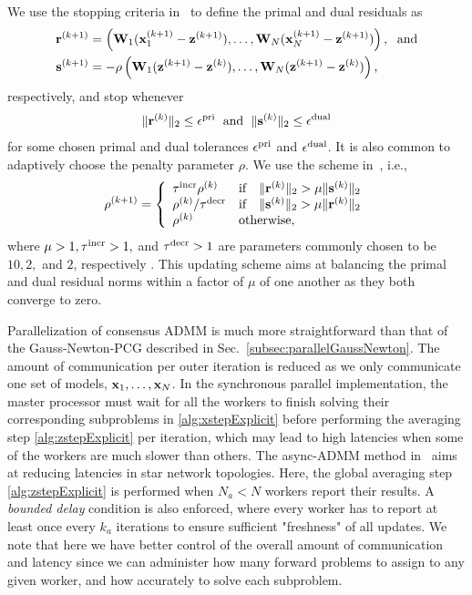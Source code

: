 \documentclass[11pt]{article}          %
\newcommand{\bfW}{{\bf W}}
\newcommand{\bfs}{{\bf s}}
\newcommand{\bfr}{{\bf r}}
\newcommand{\bfx}{{\bf  x}}
\newcommand{\bfz}{{\bf z}}
\begin{document}
We use the stopping criteria in~\cite{boyd2011distributed} to define the primal and dual residuals as 
\begin{align}
\bfr^{(k+1)} &= \left(\bfW_1 (\bfx_1^{(k+1)} - \bfz^{(k+1)}),\ldots, \bfW_N(\bfx_N^{(k+1)}-\bfz^{(k+1)})\right), \; \label{eq:primalRes}\text{ and} \\
\bfs^{(k+1)} &= -\rho\left(\bfW_1(\bfz^{(k+1)} - \bfz^{(k)}),\ldots,\bfW_N(\bfz^{(k+1)} - \bfz^{(k)})\right), \label{eq:dualRes}
\end{align}
respectively, and stop whenever 
\begin{align}
\label{eq:stopCrit}
  \| \bfr^{(k)} \|_2 \leq \epsilon^{\rm pri} \; \text{ and } \; \| \bfs^{(k)} \|_2 \leq \epsilon^{\rm dual}
\end{align}
for some chosen primal and dual tolerances $\epsilon^{\rm pri}$ and $\epsilon^{\rm dual}$. It is also common to adaptively choose the penalty parameter $\rho$. We use the scheme in~\cite{boyd2011distributed}, i.e.,
\begin{equation} 
\label{eq:adaptiveRho}
\rho^{(k+1)} =   \left\{
\begin{array}{ll}
      \tau^{\rm incr} \rho^{(k)} & \text{if} \quad \Vert \bfr^{(k)} \Vert_2 > \mu \Vert \bfs^{(k)} \Vert_2 \\
      \rho^{(k)}/ \tau^{\rm decr} & \text{if} \quad \Vert \bfs^{(k)} \Vert_2 > \mu \Vert \bfr^{(k)} \Vert_2 \\
      \rho^{(k)} & \text{otherwise},
\end{array} 
\right. 
\end{equation}
where $\mu>1, \tau^{\rm incr}>1, $ and $\tau^{\rm decr}>1$ are parameters commonly chosen to be $10, 2,$ and $2$, respectively \cite{boyd2011distributed}. This updating scheme aims at balancing the primal and dual residual norms within a factor of $\mu$ of one another as they both converge to zero. 


Parallelization of consensus ADMM is much more straightforward than that of the Gauss-Newton-PCG described in Sec.~\ref{subsec:parallelGaussNewton}. The amount of communication per outer iteration is reduced as we only communicate one set of models, $\bfx_1,\ldots,\bfx_N$. In the synchronous parallel implementation, the master processor must wait for all the workers to finish solving their corresponding subproblems in \eqref{alg:xstepExplicit} before performing the averaging step \eqref{alg:zstepExplicit} per iteration, which may lead to high latencies when some of the workers are much slower than others. The async-ADMM method in~\cite{zhang2014asynchronous} aims at reducing latencies in star network topologies. Here, the global averaging step \eqref{alg:zstepExplicit} is performed when $N_a < N$ workers report their results. A \textit{bounded delay} condition is also enforced, where every worker has to report at least once every $k_a$ iterations to ensure sufficient "freshness" of all updates. We note that here we have better control of the overall amount of communication and latency since we can administer how many forward problems to assign to any given worker, and how accurately to solve each subproblem.
\end{document}
